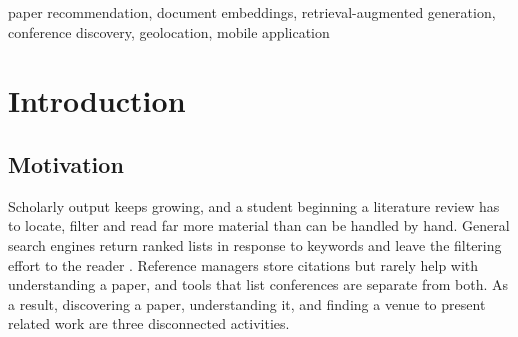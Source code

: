 \documentclass[conference]{IEEEtran}
\begin{document}
\maketitle

\begin{abstract}
Researchers usually discover papers, understand them and find relevant events in three separate tools. This paper presents \textbf{ScholarPilot}, an Android application that brings these steps together. A content-based recommender ranks papers by the cosine similarity between SPECTER2 document embeddings and a user profile built from selected interests and bookmarks, and then diversifies the batch with Maximal Marginal Relevance. A conversational assistant answers questions about a paper using a large language model grounded in the paper's metadata and abstract. A location-aware module combines open conference listings with on-device geocoding, so that upcoming conferences are sorted by their distance from the user, shown on an OpenStreetMap map and linked to turn-by-turn directions in Google Maps. The interface follows a soft, tactile claymorphic style. We describe the architecture, the data sources and the algorithms, and we define an evaluation protocol based on Precision@K, MAP, latency and the System Usability Scale.
\end{abstract}

\begin{IEEEkeywords}
paper recommendation, document embeddings, retrieval-augmented generation, conference discovery, geolocation, mobile application
\end{IEEEkeywords}

\section{Introduction}
\subsection{Motivation}
Scholarly output keeps growing, and a student beginning a literature review has to locate, filter and read far more material than can be handled by hand. General search engines return ranked lists in response to keywords and leave the filtering effort to the reader \cite{beel2016}. Reference managers store citations but rarely help with understanding a paper, and tools that list conferences are separate from both. As a result, discovering a paper, understanding it, and finding a venue to present related work are three disconnected activities.
\end{document}
